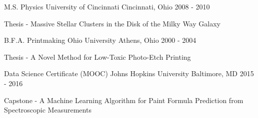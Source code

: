 

\begin{cventries}

  \cventry
    {M.S. Physics} %
    {University of Cincinnati} %
    {Cincinnati, Ohio} %
    {2008 - 2010} %
    {
      \begin{cvitems} %
        \item {Thesis - Massive Stellar Clusters in the Disk of the Milky Way Galaxy}
      \end{cvitems}
    }

  \cventry
    {B.F.A. Printmaking} %
    {Ohio University} %
    {Athens, Ohio} %
    {2000 - 2004} %
    {
      \begin{cvitems} %
        \item {Thesis - A Novel Method for Low-Toxic Photo-Etch Printing}
      \end{cvitems}
    }

  \cventry
    {Data Science Certificate (MOOC)} %
    {Johns Hopkins University} %
    {Baltimore, MD} %
    {2015 - 2016} %
    {
      \begin{cvitems} %
        \item {Capstone - A Machine Learning Algorithm for Paint Formula Prediction from Spectroscopic Measurements}
      \end{cvitems}
    }

\end{cventries}
